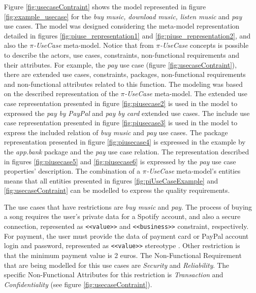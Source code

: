 Figure \ref{fig:usecaseContraint} shows
the model represented in figure \ref{fig:example_usecase} for the \textit{buy
music, download music, listen music} and \textit{pay} use cases. The model was
designed considering the meta-model representation detailed in figures
\ref{fig:piuse_representation1} and \ref{fig:piuse_representation2}, and also
the \textit{$\pi$-UseCase} meta-model. Notice that from  \textit{$\pi$-UseCase}
concepts is possible to describe the actors, use cases, constraints,
non-functional requirements and their attributes. For example, the \textit{pay}
use case (figure \ref{fig:usecaseContraint}), there are extended use cases, constraints, packages, non-functional requirements and non-functional
attributes related to this function. The modeling was based on the described
representation of the \textit{$\pi$-UseCase} meta-model. The extended use case
representation presented in figure \ref{fig:piusecase2} is used in the model to
expressed the \textit{pay by PayPal} and \textit{pay by card} extended use
cases. The include use case representation presented in figure \ref{fig:piusecase3} is
used in the model to express the included relation of \textit{buy music} and
\textit{pay} use cases. The package representation presented in figure
\ref{fig:piusecase4} is expressed in the example by the \textit{app.bank}
package and the \textit{pay} use case relation. The representation described in figures
\ref{fig:piusecase5} and \ref{fig:piusecase6} is expressed by the \textit{pay}
use case properties' description. The combination of a \textit{$\pi$-UseCase}
meta-model's entities means that all entities presented in figures
\ref{fig:piUseCaseExample} and \ref{fig:usecaseContraint} can be modelled to
express the quality requirements.

The use cases that have restrictions are \textit{buy music} and
\textit{pay}. The process of buying a song requires the user's private data
for a Spotify account, and also a secure connection, represented as
\texttt{<<value>>} and \texttt{<<business>>} constraint, respectively. For
payment, the user must provide the data of payment card or PayPal account login
and password, represented as \texttt{<<value>>} stereotype . Other restriction
is that the minimum payment value is 2 euros. The {\sc Non-Functional
Requirement} that are being modelled for this use cases are \textit{Security}
and \textit{Reliability}. The specific {\sc Non-Functional Attributes} for this
restriction is \textit{Transaction} and \textit{Confidentiality} (see figure
\ref{fig:usecaseContraint}).


